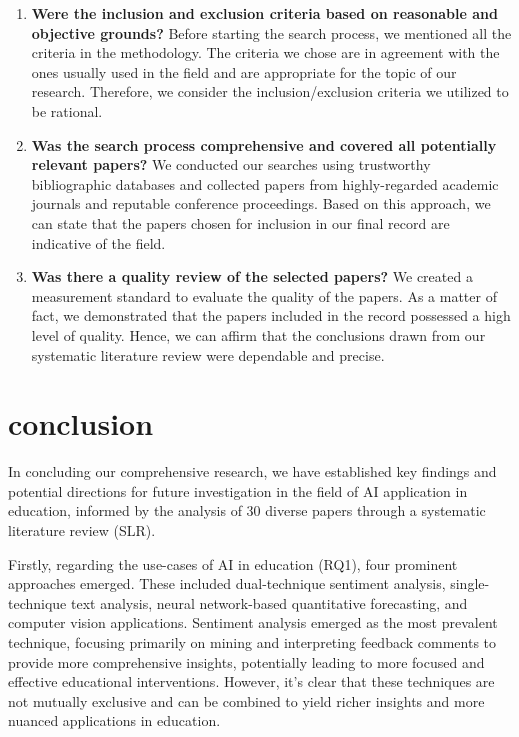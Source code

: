 \begin{enumerate}

\item \textbf{Were the inclusion and exclusion criteria based on reasonable and objective grounds?}
Before starting the search process, we mentioned all the criteria in the methodology. The criteria we chose are in agreement with the ones usually used in the field and are appropriate for the topic of our research. Therefore, we consider the inclusion/exclusion criteria we utilized to be rational.
\item \textbf{Was the search process comprehensive and covered all potentially relevant papers?}
We conducted our searches using trustworthy bibliographic databases and collected papers from highly-regarded academic journals and reputable conference proceedings. Based on this approach, we can state that the papers chosen for inclusion in our final record are indicative of the field.

\item \textbf{Was there a quality review of the selected papers?}
We created a measurement standard to evaluate the quality of the papers. As a matter of fact, we demonstrated that the papers included in the record possessed a high level of quality. Hence, we can affirm that the conclusions drawn from our systematic literature review were dependable and precise.
\end{enumerate}


\section{conclusion}
\label{conclusion}
In concluding our comprehensive research, we have established key findings and potential directions for future investigation in the field of AI application in education, informed by the analysis of 30 diverse papers through a systematic literature review (SLR).

Firstly, regarding the use-cases of AI in education (RQ1), four prominent approaches emerged. These included dual-technique sentiment analysis, single-technique text analysis, neural network-based quantitative forecasting, and computer vision applications. Sentiment analysis emerged as the most prevalent technique, focusing primarily on mining and interpreting feedback comments to provide more comprehensive insights, potentially leading to more focused and effective educational interventions. However, it's clear that these techniques are not mutually exclusive and can be combined to yield richer insights and more nuanced applications in education.

